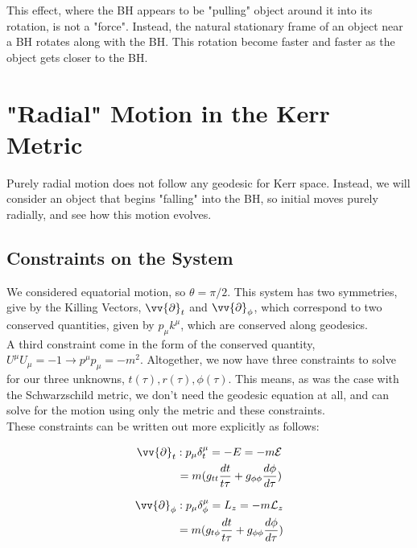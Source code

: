 \documentclass[11pt,table]{article}
\begin{document}
This effect, where the BH appears to be "pulling" object around it into its rotation, is not a "force". Instead, the natural stationary frame of an object near a BH rotates along with the BH. This rotation become faster and faster as the object gets closer to the BH. 


\section{"Radial" Motion in the Kerr Metric}

Purely radial motion does not follow any geodesic for Kerr space. Instead, we will consider an object that begins "falling" into the BH, so initial moves purely radially, and see how this motion evolves. \\

\subsection{Constraints on the System}

We considered equatorial motion, so $\theta = \pi/2$. This system has two symmetries, give by the Killing Vectors, $\vv{\partial}_t$ and $\vv{\partial}_\phi$, which correspond to two conserved quantities, given by $p_\mu k^\mu$, which are conserved along geodesics. \\

A third constraint come in the form of the conserved quantity, $U^\mu U_\mu = -1 \rightarrow p^\mu p_\mu = -m^2$. Altogether, we now have three constraints to solve for our three unknowns, $t(\tau), r(\tau), \phi(\tau)$. This means, as was the case with the Schwarzschild metric, we don't need the geodesic equation at all, and can solve for the motion using only the metric and these constraints.  \\

These constraints can be written out more explicitly as follows:

\begin{equation}
    \begin{aligned}
    \vv{\partial}_t : p_\mu \delta^\mu_t = - E = -m\mathcal{E}\\
    = m(g_{tt} \frac{dt}{t\tau}+g_{\phi\phi}\frac{d\phi}{d\tau})\\
    \label{eq:timeConstraint}
    \end{aligned}
\end{equation}

\begin{equation}
    \begin{aligned}
    \vv{\partial}_\phi : p_\mu \delta^\mu_\phi = L_z = -m\mathcal{L}_z\\
    = m(g_{t\phi} \frac{dt}{t\tau}+g_{\phi\phi}\frac{d\phi}{d\tau})\\
    \vspace{0.5cm}
    \label{eq:phiConstraint}
    \end{aligned}
\end{equation}
\end{document}

